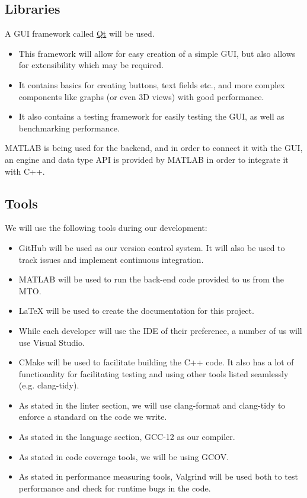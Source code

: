 \documentclass{article}
\begin{document}
\subsection{Libraries}
A GUI framework called \href{https://www.qt.io/}{Qt} will be used.
\begin{itemize}
	\item This framework will allow for easy creation of a simple GUI, but also allows for extensibility which may be required.
	\item It contains basics for creating buttons, text fields etc., and more complex components like graphs (or even 3D views) with good performance.
	\item It also contains a testing framework for easily testing the GUI, as well as benchmarking performance.
\end{itemize}
MATLAB is being used for the backend, and in order to connect it with the GUI, an engine and data type API is 
provided by MATLAB in order to integrate it with C++.

\subsection{Tools}
We will use the following tools during our development:
\begin{itemize}
	\item GitHub will be used as our version control system. It will also be used to track issues and implement continuous integration.
	\item MATLAB will be used to run the back-end code provided to us from the MTO.
	\item LaTeX will be used to create the documentation for this project.
	\item While each developer will use the IDE of their preference, a number of us will use Visual Studio.
	\item CMake will be used to facilitate building the C++ code. It also has a lot of functionality for facilitating testing and using other tools listed seamlessly (e.g. clang-tidy).
	\item As stated in the linter section, we will use clang-format and clang-tidy to enforce a standard on the code we write.
	\item As stated in the language section, GCC-12 as our compiler.
	\item As stated in code coverage tools, we will be using GCOV.
	\item As stated in performance measuring tools, Valgrind will be used both to test performance and check for runtime bugs in the code.
\end{itemize}
\end{document}
